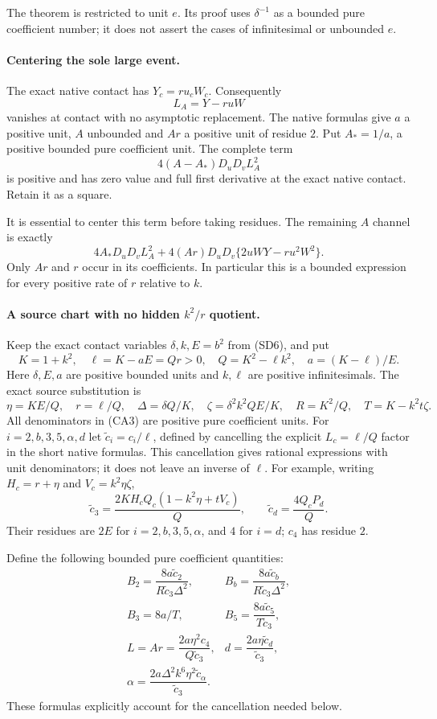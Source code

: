 The theorem is restricted to unit $e$. Its proof uses $\delta^{-1}$
as a bounded pure coefficient number; it does not assert the cases of
infinitesimal or unbounded $e$.

\paragraph{Centering the sole large event.}
The exact native contact has $Y_c=r u_cW_c$. Consequently
\[
 L_A=Y-r uW
\]
vanishes at contact with no asymptotic replacement. The native formulas
give $a$ a positive unit, $A$ unbounded and $Ar$ a positive unit of
residue $2$. Put $A_*=1/a$, a positive bounded pure coefficient unit.
The complete term
\[
             4(A-A_*)D_uD_v L_A^2                         \tag{CA1}
\]
is positive and has zero value and full first derivative at the exact
native contact. Retain it as a square.

It is essential to center this term before taking residues.
The remaining $A$ channel is exactly
\[
 4A_*D_uD_vL_A^2+
 4(Ar)D_uD_v\{2uWY-r u^2W^2\}.                         \tag{CA2}
\]
Only $Ar$ and $r$ occur in its coefficients. In particular this is a
bounded expression for every positive rate of $r$ relative to $k$.

\paragraph{A source chart with no hidden $k^2/r$ quotient.}
Keep the exact contact variables $\delta,k,E=b^2$ from (SD6), and put
\[
 K=1+k^2,\quad \ell=K-aE=Qr>0,\quad
 Q=K^2-\ell k^2,\quad a=(K-\ell)/E.
\]
Here $\delta,E,a$ are positive bounded units and $k,\ell$ are positive
infinitesimals. The exact source substitution is
\[
 \eta=KE/Q,\quad r=\ell/Q,\quad
 \Delta=\delta Q/K,\quad \zeta=\delta^2k^2QE/K,
 \quad R=K^2/Q,\quad T=K-k^2t\zeta.                    \tag{CA3}
\]
All denominators in (CA3) are positive pure coefficient units.
For $i=2,b,3,5,\alpha,d$ let $\widetilde c_i=c_i/\ell$,
defined by cancelling the explicit $L_c=\ell/Q$ factor in the short
native formulas. This cancellation gives rational expressions with
unit denominators; it does not leave an inverse of $\ell$.
For example, writing $H_c=r+\eta$ and $V_c=k^2\eta\zeta$,
\[
 \widetilde c_3=\frac{2KH_cQ_c(1-k^2\eta+tV_c)}Q,
 \qquad \widetilde c_d=\frac{4Q_cP_d}Q.
\]
Their residues are $2E$ for $i=2,b,3,5,\alpha$, and $4$ for $i=d$;
$c_4$ has residue $2$.

Define the following bounded pure coefficient quantities:
\[
 \begin{array}{ll}
 B_2=\dfrac{8a\widetilde c_2}{R\widetilde c_3\Delta^2},&
 B_b=\dfrac{8a\widetilde c_b}{R\widetilde c_3\Delta^2},\\[4pt]
 B_3=8a/T,&B_5=\dfrac{8a\widetilde c_5}{T\widetilde c_3},\\[4pt]
 L=Ar=\dfrac{2a\eta^2c_4}{Q\widetilde c_3},&
 d=\dfrac{2a\eta\widetilde c_d}{\widetilde c_3},\\[4pt]
 \alpha=\dfrac{2a\Delta^2k^6\eta^2\widetilde c_\alpha}
                    {\widetilde c_3}.&
 \end{array}                                                     \tag{CA4}
\]
These formulas explicitly account for the cancellation needed below.

